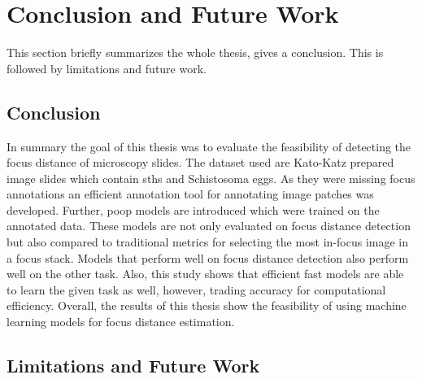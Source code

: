 \chapter{Conclusion and Future Work}
\label{ch:Conclusion}

This section briefly summarizes the whole thesis, gives a conclusion. This is followed by limitations and future work.



\section{Conclusion}
\label{sec:Conclusion:Conclusion}

In summary the goal of this thesis was to evaluate the feasibility of detecting the focus distance of microscopy slides. The dataset used are Kato-Katz prepared image slides which contain \aclp{sth} and Schistosoma eggs. As they were missing focus annotations an efficient annotation tool for annotating image patches was developed. Further, \ac{poop} models are introduced which were trained on the annotated data. These models are not only evaluated on focus distance detection but also compared to traditional metrics for selecting the most in-focus image in a focus stack. Models that perform well on focus distance detection also perform well on the other task. Also, this study shows that efficient fast models are able to learn the given task as well, however, trading accuracy for computational efficiency.
Overall, the results of this thesis show the feasibility of using machine learning models for focus distance estimation.


\section{Limitations and Future Work}
\label{sec:Conclusion:FutureWork}

